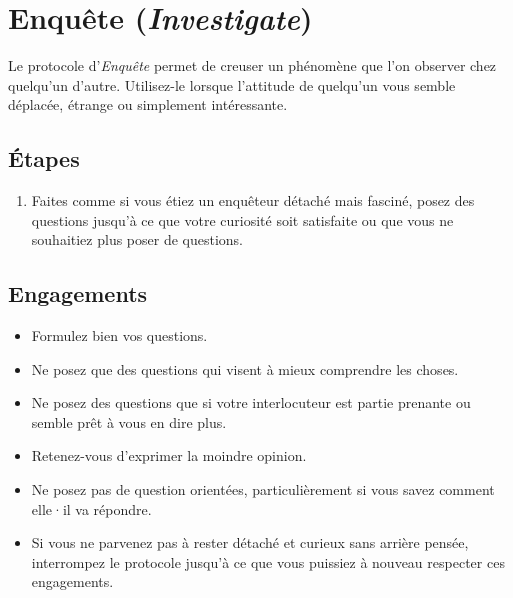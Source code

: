 \documentclass[11pt]{book}
\let\oldsection\section
\renewcommand\section{\clearpage\oldsection}
\begin{document}
\section{Enquête (\emph{Investigate})}

Le protocole d'\emph{Enquête} permet de creuser un phénomène que l'on observer chez quelqu'un d'autre. Utilisez-le lorsque l'attitude de quelqu'un vous 
semble déplacée, étrange ou simplement intéressante. 

\subsection{Étapes}
\begin{enumerate}
	\item Faites comme si vous étiez un enquêteur détaché mais fasciné, posez des questions jusqu'à ce que votre curiosité soit satisfaite ou que vous
	      ne souhaitiez plus poser de questions.
\end{enumerate}

\subsection{Engagements}
\begin{itemize}
	\item Formulez bien vos questions.
	\item Ne posez que des questions qui visent à mieux comprendre les choses.
	\item Ne posez des questions que si votre interlocuteur est partie prenante ou semble prêt à vous en dire plus.
	\item Retenez-vous d'exprimer la moindre opinion.
	\item Ne posez pas de question orientées, particulièrement si vous savez comment elle·il va répondre. 
	\item Si vous ne parvenez pas à rester détaché et curieux sans arrière pensée, interrompez le protocole jusqu'à ce que vous puissiez à nouveau 
	      respecter ces engagements.
\end{itemize}
\end{document}
